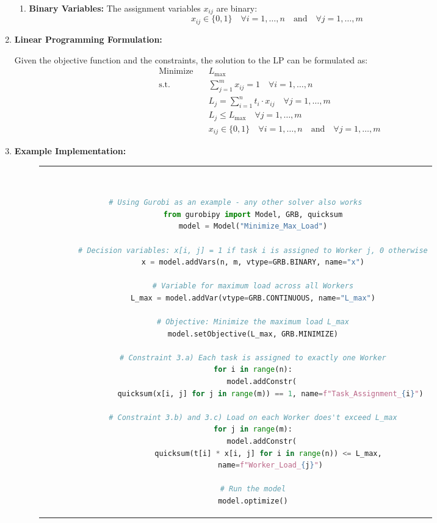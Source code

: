 \begin{enumerate}
\begin{enumerate}
    \item \textbf{Binary Variables:} The assignment variables \( x_{ij} \) are binary:
    \begin{equation}
    x_{ij} \in \{0, 1\} \quad \forall i = 1, \dots, n \quad \text{and} \quad \forall j = 1, \dots, m
    \end{equation}
\end{enumerate}

\item \textbf{Linear Programming Formulation:}

Given the objective function and the constraints, the solution to the \ac{LP} can be formulated as:
\begin{align}
\text{Minimize} \quad & L_{\text{max}} \\
\text{s.t.} \quad & \sum_{j=1}^{m} x_{ij} = 1 \quad \forall i = 1, \dots, n \\
& L_j = \sum_{i=1}^{n} t_i \cdot x_{ij} \quad \forall j = 1, \dots, m \\
& L_j \leq L_{\text{max}} \quad \forall j = 1, \dots, m \\
& x_{ij} \in \{0, 1\} \quad \forall i = 1, \dots, n \quad \text{and} \quad \forall j = 1, \dots, m
\end{align}
\item \textbf{Example Implementation:} 

    \begin{figure}[htpb]
      \begin{tabular}{c}
      \ \small \begin{lstlisting}[language=Python]
        # Using Gurobi as an example - any other solver also works
        from gurobipy import Model, GRB, quicksum
        model = Model("Minimize_Max_Load")
        
        # Decision variables: x[i, j] = 1 if task i is assigned to Worker j, 0 otherwise
        x = model.addVars(n, m, vtype=GRB.BINARY, name="x")
        
        # Variable for maximum load across all Workers
        L_max = model.addVar(vtype=GRB.CONTINUOUS, name="L_max")
        
        # Objective: Minimize the maximum load L_max
        model.setObjective(L_max, GRB.MINIMIZE)
        
        # Constraint 3.a) Each task is assigned to exactly one Worker
        for i in range(n):
            model.addConstr(
                quicksum(x[i, j] for j in range(m)) == 1, name=f"Task_Assignment_{i}")
        
        # Constraint 3.b) and 3.c) Load on each Worker does't exceed L_max
        for j in range(m):
            model.addConstr(
                quicksum(t[i] * x[i, j] for i in range(n)) <= L_max, 
                name=f"Worker_Load_{j}")
        
        # Run the model
        model.optimize()
        \end{lstlisting}
      \end{tabular}
      \label{fig:lp-optimization}
    \end{figure}

\end{enumerate}
